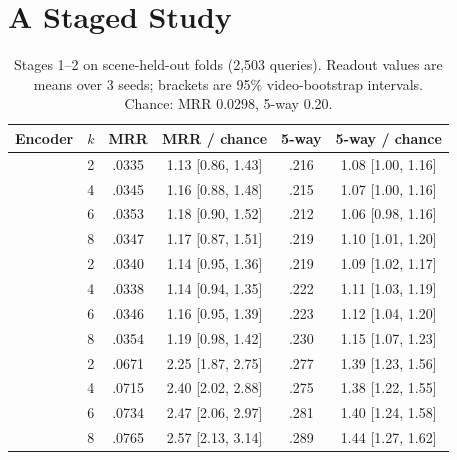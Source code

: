 \documentclass[conference,a4paper]{IEEEtran}
\begin{document}
\section{A Staged Study}

\begin{table}[t]
\caption{Stages 1--2 on scene-held-out folds (2,503 queries). Readout values are means over 3 seeds; brackets are 95\% video-bootstrap intervals. Chance: MRR 0.0298, 5-way 0.20.}
\label{tab:main}
\centering
\setlength{\tabcolsep}{3.5pt}
\footnotesize
\begin{tabular}{llcccc}
\toprule
Encoder & $k$ & MRR & MRR / chance & 5-way & 5-way / chance \\
\midrule
{}
 & 2 & .0335 & 1.13 [0.86, 1.43] & .216 & 1.08 [1.00, 1.16] \\
 & 4 & .0345 & 1.16 [0.88, 1.48] & .215 & 1.07 [1.00, 1.16] \\
 & 6 & .0353 & 1.18 [0.90, 1.52] & .212 & 1.06 [0.98, 1.16] \\
 & 8 & .0347 & 1.17 [0.87, 1.51] & .219 & 1.10 [1.01, 1.20] \\
\midrule
{}
 & 2 & .0340 & 1.14 [0.95, 1.36] & .219 & 1.09 [1.02, 1.17] \\
 & 4 & .0338 & 1.14 [0.94, 1.35] & .222 & 1.11 [1.03, 1.19] \\
 & 6 & .0346 & 1.16 [0.95, 1.39] & .223 & 1.12 [1.04, 1.20] \\
 & 8 & .0354 & 1.19 [0.98, 1.42] & .230 & 1.15 [1.07, 1.23] \\
\midrule
{}
 & 2 & .0671 & 2.25 [1.87, 2.75] & .277 & 1.39 [1.23, 1.56] \\
 & 4 & .0715 & 2.40 [2.02, 2.88] & .275 & 1.38 [1.22, 1.55] \\
 & 6 & .0734 & 2.47 [2.06, 2.97] & .281 & 1.40 [1.24, 1.58] \\
 & 8 & .0765 & 2.57 [2.13, 3.14] & .289 & 1.44 [1.27, 1.62] \\
\bottomrule
\end{tabular}
\end{table}
\end{document}
